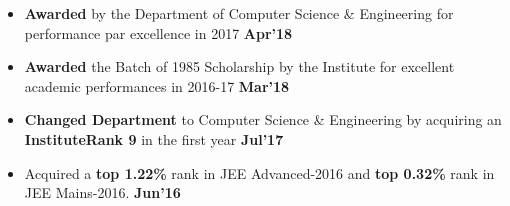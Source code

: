 \documentclass[10pt]{article}
\begin{document}
\begin{itemize}[leftmargin=*]
\item \textbf{Awarded} by the Department of Computer Science \& Engineering for performance par excellence in 2017 \href{https://github.com/shmundhra/Credentials/blob/master/Academics/Student_Par_Excellence.pdf} {\hspace{0.5ex}\footnotesize\faMousePointer} {\hfill}\textbf{Apr'18}\\[-1.8em]
\item \textbf{Awarded} the Batch of 1985 Scholarship by the Institute for excellent academic performances in 2016-17 \href{https://github.com/shmundhra/Credentials/blob/master/Scholarships/Batch_of_1985_Scholarship.pdf} {\hspace{0.5ex}\footnotesize\faMousePointer} {\hfill}\textbf{Mar'18}\\[-1.8em]
\item \textbf{Changed Department} to Computer Science \& Engineering by acquiring an \textbf{InstituteRank 9} in the first year \href{https://github.com/shmundhra/Credentials/blob/master/Academics/DepartmentChange_IITKGP.pdf} {\hspace{0.5ex}\footnotesize\faMousePointer} {\hfill}\textbf{Jul'17}\\[-1.8em]
 \item Acquired a \textbf{top 1.22\%} rank in JEE Advanced-2016 and \textbf{top 0.32\%} rank in JEE Mains-2016. \href{https://github.com/shmundhra/Credentials/blob/master/Academics/JEE.png} {\hspace{0.5ex}\footnotesize\faMousePointer} {\hfill}\textbf{Jun'16}\\[-1.8em]

\end{itemize}
\end{document}
